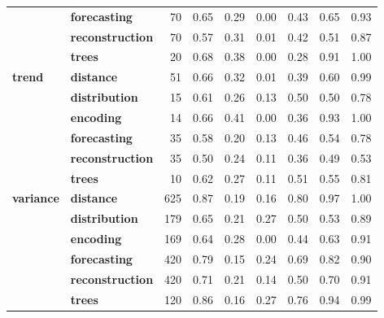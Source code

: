 \begin{table}[p]
\begin{tabular}{llrllllll}
\textbf{} & \textbf{forecasting} & 70 & 0.65 & 0.29 & 0.00 & 0.43 & 0.65 & 0.93 \\
\textbf{} & \textbf{reconstruction} & 70 & 0.57 & 0.31 & 0.01 & 0.42 & 0.51 & 0.87 \\
\textbf{} & \textbf{trees} & 20 & 0.68 & 0.38 & 0.00 & 0.28 & 0.91 & 1.00 \\
\cline{1-9}
\multirow[t]{6}{*}{\textbf{trend}} & \textbf{distance} & 51 & 0.66 & 0.32 & 0.01 & 0.39 & 0.60 & 0.99 \\
\textbf{} & \textbf{distribution} & 15 & 0.61 & 0.26 & 0.13 & 0.50 & 0.50 & 0.78 \\
\textbf{} & \textbf{encoding} & 14 & 0.66 & 0.41 & 0.00 & 0.36 & 0.93 & 1.00 \\
\textbf{} & \textbf{forecasting} & 35 & 0.58 & 0.20 & 0.13 & 0.46 & 0.54 & 0.78 \\
\textbf{} & \textbf{reconstruction} & 35 & 0.50 & 0.24 & 0.11 & 0.36 & 0.49 & 0.53 \\
\textbf{} & \textbf{trees} & 10 & 0.62 & 0.27 & 0.11 & 0.51 & 0.55 & 0.81 \\
\cline{1-9}
\multirow[t]{6}{*}{\textbf{variance}} & \textbf{distance} & 625 & 0.87 & 0.19 & 0.16 & 0.80 & 0.97 & 1.00 \\
\textbf{} & \textbf{distribution} & 179 & 0.65 & 0.21 & 0.27 & 0.50 & 0.53 & 0.89 \\
\textbf{} & \textbf{encoding} & 169 & 0.64 & 0.28 & 0.00 & 0.44 & 0.63 & 0.91 \\
\textbf{} & \textbf{forecasting} & 420 & 0.79 & 0.15 & 0.24 & 0.69 & 0.82 & 0.90 \\
\textbf{} & \textbf{reconstruction} & 420 & 0.71 & 0.21 & 0.14 & 0.50 & 0.70 & 0.91 \\
\textbf{} & \textbf{trees} & 120 & 0.86 & 0.16 & 0.27 & 0.76 & 0.94 & 0.99 \\
\cline{1-9}
\bottomrule
\end{tabular}
\end{table}
